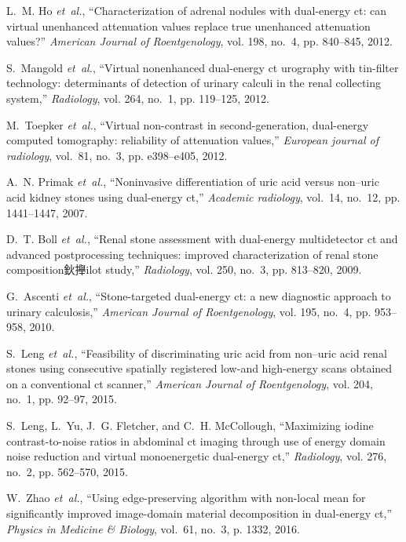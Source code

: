 \documentclass[journal,twoside,web]{ieeecolor}
\begin{document}
\begin{thebibliography}{10}
L.~M. Ho \emph{et~al.}, ``Characterization of adrenal nodules with dual-energy
  ct: can virtual unenhanced attenuation values replace true unenhanced
  attenuation values?'' \emph{American Journal of Roentgenology}, vol. 198,
  no.~4, pp. 840--845, 2012.

S.~Mangold \emph{et~al.}, ``Virtual nonenhanced dual-energy ct urography with
  tin-filter technology: determinants of detection of urinary calculi in the
  renal collecting system,'' \emph{Radiology}, vol. 264, no.~1, pp. 119--125,
  2012.

M.~Toepker \emph{et~al.}, ``Virtual non-contrast in second-generation,
  dual-energy computed tomography: reliability of attenuation values,''
  \emph{European journal of radiology}, vol.~81, no.~3, pp. e398--e405, 2012.

A.~N. Primak \emph{et~al.}, ``Noninvasive differentiation of uric acid versus
  non--uric acid kidney stones using dual-energy ct,'' \emph{Academic
  radiology}, vol.~14, no.~12, pp. 1441--1447, 2007.

D.~T. Boll \emph{et~al.}, ``Renal stone assessment with dual-energy
  multidetector ct and advanced postprocessing techniques: improved
  characterization of renal stone composition鈥攑ilot study,''
  \emph{Radiology}, vol. 250, no.~3, pp. 813--820, 2009.

G.~Ascenti \emph{et~al.}, ``Stone-targeted dual-energy ct: a new diagnostic
  approach to urinary calculosis,'' \emph{American Journal of Roentgenology},
  vol. 195, no.~4, pp. 953--958, 2010.

S.~Leng \emph{et~al.}, ``Feasibility of discriminating uric acid from non--uric
  acid renal stones using consecutive spatially registered low-and high-energy
  scans obtained on a conventional ct scanner,'' \emph{American Journal of
  Roentgenology}, vol. 204, no.~1, pp. 92--97, 2015.

S.~Leng, L.~Yu, J.~G. Fletcher, and C.~H. McCollough, ``Maximizing iodine
  contrast-to-noise ratios in abdominal ct imaging through use of energy domain
  noise reduction and virtual monoenergetic dual-energy ct,'' \emph{Radiology},
  vol. 276, no.~2, pp. 562--570, 2015.

W.~Zhao \emph{et~al.}, ``Using edge-preserving algorithm with non-local mean
  for significantly improved image-domain material decomposition in dual-energy
  ct,'' \emph{Physics in Medicine \& Biology}, vol.~61, no.~3, p. 1332, 2016.


\end{thebibliography}
\end{document}
